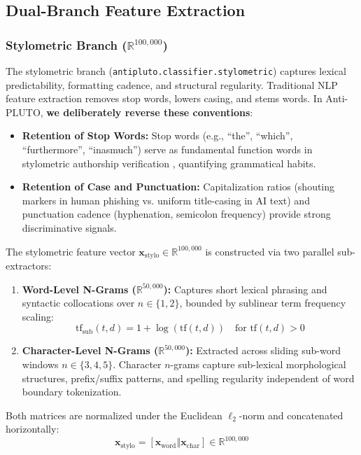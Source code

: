 \documentclass[journal]{IEEEtran}
\begin{document}
\subsection{Dual-Branch Feature Extraction}

\subsubsection{Stylometric Branch ($\mathbb{R}^{100,000}$)}
The stylometric branch (\texttt{antipluto.classifier.stylometric}) captures lexical predictability, formatting cadence, and structural regularity. Traditional NLP feature extraction removes stop words, lowers casing, and stems words. In Anti-PLUTO, \textbf{we deliberately reverse these conventions}:
\begin{itemize}
    \item \textbf{Retention of Stop Words:} Stop words (e.g., ``the'', ``which'', ``furthermore'', ``inasmuch'') serve as fundamental function words in stylometric authorship verification \cite{stamatatos2009survey}, quantifying grammatical habits.
    \item \textbf{Retention of Case and Punctuation:} Capitalization ratios (shouting markers in human phishing vs. uniform title-casing in AI text) and punctuation cadence (hyphenation, semicolon frequency) provide strong discriminative signals.
\end{itemize}

The stylometric feature vector $\mathbf{x}_{\text{stylo}} \in \mathbb{R}^{100,000}$ is constructed via two parallel sub-extractors:
\begin{enumerate}
    \item \textbf{Word-Level N-Grams ($\mathbb{R}^{50,000}$):} Captures short lexical phrasing and syntactic collocations over $n \in \{1, 2\}$, bounded by sublinear term frequency scaling:
    \begin{equation}
        \text{tf}_{\text{sub}}(t, d) = 1 + \log(\text{tf}(t, d)) \quad \text{for } \text{tf}(t, d) > 0
    \end{equation}
    \item \textbf{Character-Level N-Grams ($\mathbb{R}^{50,000}$):} Extracted across sliding sub-word windows $n \in \{3, 4, 5\}$. Character $n$-grams capture sub-lexical morphological structures, prefix/suffix patterns, and spelling regularity independent of word boundary tokenization.
\end{enumerate}
Both matrices are normalized under the Euclidean $\ell_2$-norm and concatenated horizontally:
\begin{equation}
    \mathbf{x}_{\text{stylo}} = [\mathbf{x}_{\text{word}} \mathbin{\Vert} \mathbf{x}_{\text{char}}] \in \mathbb{R}^{100,000}
\end{equation}
\end{document}
